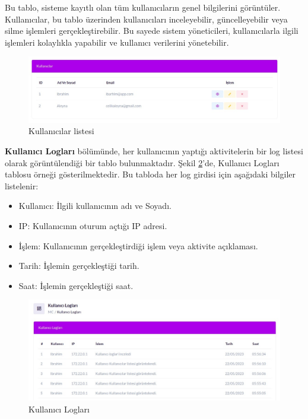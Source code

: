 Bu tablo, sisteme kayıtlı olan tüm kullanıcıların genel bilgilerini görüntüler. Kullanıcılar, bu tablo üzerinden kullanıcıları inceleyebilir, güncelleyebilir veya silme işlemleri gerçekleştirebilir. Bu sayede sistem yöneticileri, kullanıcılarla ilgili işlemleri kolaylıkla yapabilir ve kullanıcı verilerini yönetebilir.
\begin{figure}[ht]
  \centering
  \includegraphics[width=0.6\linewidth]{images/users.jpeg}
  \caption{Kullanıcılar listesi}
  \label{fig:users}
\end{figure}

\textbf{Kullanıcı Logları} bölümünde, her kullanıcının yaptığı aktivitelerin bir log listesi olarak görüntülendiği bir tablo bulunmaktadır. Şekil \ref{fig:log}'de, Kullanıcı Logları tablosu örneği gösterilmektedir.
Bu tabloda her log girdisi için aşağıdaki bilgiler listelenir:
\begin{itemize}
  \item Kullanıcı: İlgili kullanıcının adı ve Soyadı.
  \item IP: Kullanıcının oturum açtığı IP adresi.
  \item İşlem: Kullanıcının gerçekleştirdiği işlem veya aktivite açıklaması.
  \item Tarih: İşlemin gerçekleştiği tarih.
  \item Saat: İşlemin gerçekleştiği saat.
\end{itemize}

\begin{figure}[ht]
  \centering
  \includegraphics[width=0.6\linewidth]{images/log.jpeg}
  \caption{Kullanıcı Logları}
  \label{fig:log}
\end{figure}

